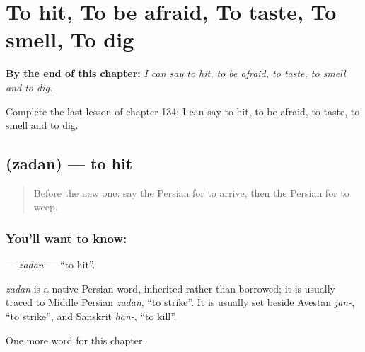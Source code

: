 
\chapter{To hit, To be afraid, To taste, To smell, To dig}
\label{ch:fa-to-hit-to-be-afraid-to-taste-to-smell-to-dig}

\begin{chapteropening}
\textbf{By the end of this chapter:} \emph{I can say to hit, to be afraid, to taste, to smell and to dig.}

Complete the last lesson of chapter 134: I can say to hit, to be afraid, to taste, to smell and to dig.
\end{chapteropening}

\section[\texorpdfstring{\fa{زدن} (zadan)}{زدن (zadan)}]{ (zadan) — to hit}

\label{lesson:FA-C134-zadan}



\begin{quote}
Before the new one: say the Persian for to arrive, then the Persian for to weep.
\end{quote}

\subsection*{You'll want to know: }
\textbf{} — \emph{zadan} — \textquotedblleft{}to hit\textquotedblright{}.

\begin{cousinweb}
\emph{zadan} is a native Persian word, inherited rather than borrowed; it is usually traced to Middle Persian \emph{zadan}, \textquotedblleft{}to strike\textquotedblright{}. It is usually set beside Avestan \emph{jan-}, \textquotedblleft{}to strike\textquotedblright{}, and Sanskrit \emph{han-}, \textquotedblleft{}to kill\textquotedblright{}.
\end{cousinweb}

\begin{grammarlens}[title={What you've built}]
One more word for this chapter.
\end{grammarlens}

